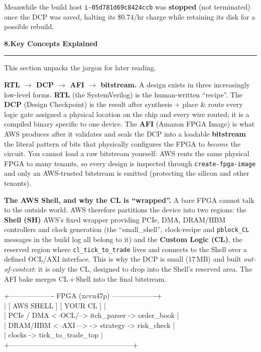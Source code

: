 \documentclass[10pt,a4paper]{article}
\newcommand{\sectionrule}{\par\nobreak\vspace{1pt}\textcolor{rulegray}{\rule{\linewidth}{0.8pt}}\par\vspace{1pt}}
\newcommand{\fpath}[1]{\texttt{\textcolor{hdrblue}{#1}}}
\newcommand{\cmd}[1]{\texttt{\textcolor{accentteal}{#1}}}
\newcommand{\sechead}[2]{{\large\bfseries\color{hdrblue} #1\quad #2}\sectionrule}
\begin{document}
Meanwhile the build host \fpath{i-05d781d69c8424ccb} was \textbf{stopped} (not
terminated) once the DCP was saved, halting its \$0.74/hr charge while retaining
its disk for a possible rebuild.

\sechead{8.}{Key Concepts Explained}

This section unpacks the jargon for later reading.

\smallskip
{\bfseries\color{accentteal} RTL $\rightarrow$ DCP $\rightarrow$ AFI $\rightarrow$ bitstream.}
A design exists in three increasingly low-level forms. \textbf{RTL} (the
SystemVerilog) is the human-written ``recipe''. The \textbf{DCP} (Design
Checkpoint) is the result after synthesis + place \& route \textendash{} every
logic gate assigned a physical location on the chip and every wire routed; it is
a compiled binary specific to one device. The \textbf{AFI} (Amazon FPGA Image) is
what AWS produces after it validates and seals the DCP into a loadable
\textbf{bitstream} \textendash{} the literal pattern of bits that physically
configures the FPGA to \emph{become} the circuit. You cannot load a raw bitstream
yourself: AWS rents the same physical FPGA to many tenants, so every design is
inspected through \cmd{create-fpga-image} and only an AWS-trusted bitstream is
emitted (protecting the silicon and other tenants).

\smallskip
{\bfseries\color{accentteal} The AWS Shell, and why the CL is ``wrapped''.}
A bare FPGA cannot talk to the outside world. AWS therefore partitions the device
into two regions: the \textbf{Shell (SH)} \textendash{} AWS's fixed wrapper
providing PCIe, DMA, DRAM/HBM controllers and clock generation (the
``small\_shell'', clock-recipe and \fpath{pblock\_CL} messages in the build log
all belong to it) \textendash{} and the \textbf{Custom Logic (CL)}, the reserved
region where \fpath{cl\_tick\_to\_trade} lives and connects to the Shell over a
defined OCL/AXI interface. This is why the DCP is small (17\,MB) and built
\emph{out-of-context}: it is only the CL, designed to drop into the Shell's
reserved area. The AFI bake merges CL\,+\,Shell into the final bitstream.

\begin{center}\footnotesize\ttfamily
+------------------- FPGA (xcvu47p) -------------------+\\
|  [ AWS SHELL ]          [ YOUR CL ]                  |\\
|  PCIe / DMA   <--OCL/--> itch\_parser -> order\_book   |\\
|  DRAM/HBM     <--AXI---> -> strategy -> risk\_check    |\\
|  clocks                 -> tick\_to\_trade\_top         |\\
+-----------------------------------------------------+
\end{center}
\end{document}
